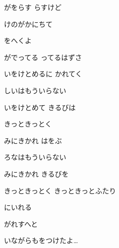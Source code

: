 \documentclass[14pt]{ltjsarticle}
\begin{document}
{\item
  がをらす らすけど
  \jisho{}

  けのがかにちて
  \jisho{}

  をへくよ
  \jisho{}

  がでってる ってるはずさ
  \jisho{}

\item
  いをけとめるに かれてく
  \jisho{}

  しいはもういらない
  \jisho{}

  いをけとめて きるびは
  \jisho{}

  きっときっとく
  \jisho{}

  みにきかれ はをぶ
  \jisho{}

  ろなはもういらない
  \jisho{}

  みにきかれ きるびを
  \jisho{}

  きっときっとく きっときっとふたり
  \jisho{}

  にいれる
  \jisho{}

  がれすへと
  \jisho{}

\item
  いながらもをつけたよ…
  \jisho{}

}
\end{document}
